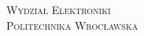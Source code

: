 \documentclass[a4paper, 11pt]{article}
\begin{document}
	
	
	
	\thispagestyle{empty}
	
	\vfill
	\begin{center}
		{\Large \textsc{Wydział Elektroniki}}\\
		{\Large \textsc{Politechnika Wrocławska}}
	\end{center}
	
	\newpage
	\tableofcontents
	
	\newpage
	
	
	
	
\end{document}

